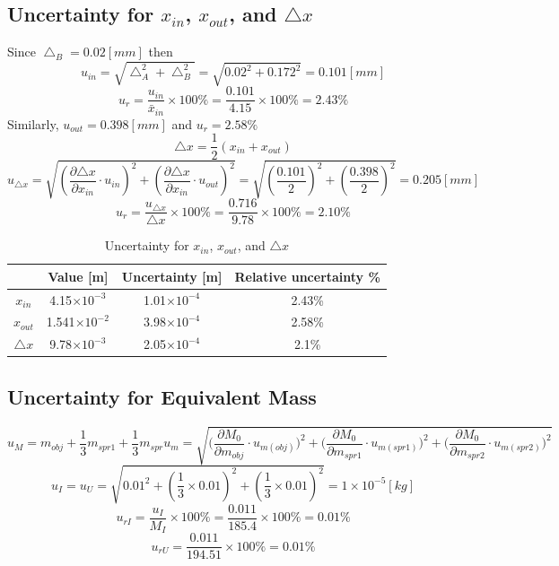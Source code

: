 \documentclass[12pt]{article}
\begin{document}
\subsection{Uncertainty for $x_{in}$, $x_{out}$, and $\bigtriangleup{x}$}
Since $\bigtriangleup_B=0.02[mm]$ then
$$u_{in}=\sqrt{\bigtriangleup_A^2+\bigtriangleup_B^2}=\sqrt{0.02^2+0.172^2}=0.101[mm]$$
$$u_r=\frac{u_{in}}{\bar{x}_{in}}\times100\%=\frac{0.101}{4.15}\times100\%=2.43\%$$
Similarly, $u_{out}=0.398[mm]$ and $u_r=2.58\%$
$$\bigtriangleup{x}=\frac{1}{2}(x_{in}+x_{out})$$
$$u_{\bigtriangleup{x}}=\sqrt{(\frac{\partial{\bigtriangleup{x}}}{\partial{x_{in}}}\cdot{u_{in}})^2+(\frac{\partial{\bigtriangleup{x}}}{\partial{x_{in}}}\cdot{u_{out}})^2}=\sqrt{(\frac{0.101}{2})^2+(\frac{0.398}{2})^2}=0.205[mm]$$
$$u_r=\frac{u_{\bigtriangleup{x}}}{\bigtriangleup{x}}\times100\%=\frac{0.716}{9.78}\times100\%=2.10\%$$
\begin{table}[H]
\centering
\begin{tabular}{|c|c|c|c|}
\hline
  & Value {[}m{]} & Uncertainty {[}m{]} & Relative uncertainty \% \\ \hline
$x_{in}$ & 4.15$\times10^{-3}$          &       1.01$\times10^{-4}$              & 2.43\%                  \\ \hline
$x_{out}$ & 1.541$\times10^{-2}$          &          3.98$\times10^{-4}$           & 2.58\%                  \\ \hline
$\bigtriangleup{x}$ & 9.78$\times10^{-3}$          &     2.05$\times10^{-4}$                 & 2.1\%                  \\ \hline
\end{tabular}
\caption{Uncertainty for $x_{in}$, $x_{out}$, and $\bigtriangleup{x}$}
\end{table}
\subsection{Uncertainty for Equivalent Mass}
$$u_M=m_{obj}+\frac{1}{3}m_{spr1}+\frac{1}{3}m_{spr}u_m=\sqrt{(\frac{\partial{M_0}}{\partial{m_{obj}}}\cdot{u_{m(obj)})^2}+(\frac{\partial{M_0}}{\partial{m_{spr1}}}\cdot{u_{m(spr1)})^2}+(\frac{\partial{M_0}}{\partial{m_{spr2}}}\cdot{u_{m(spr2)})^2}}$$
$$u_I=u_U=\sqrt{0.01^2+(\frac{1}{3}\times0.01)^2+(\frac{1}{3}\times0.01)^2}=1\times10^{-5}[kg]$$
$$u_{rI}=\frac{u_I}{M_I}\times100\%=\frac{0.011}{185.4}\times100\%=0.01\%$$
$$u_{rU}=\frac{0.011}{194.51}\times100\%=0.01\%$$
\end{document}
